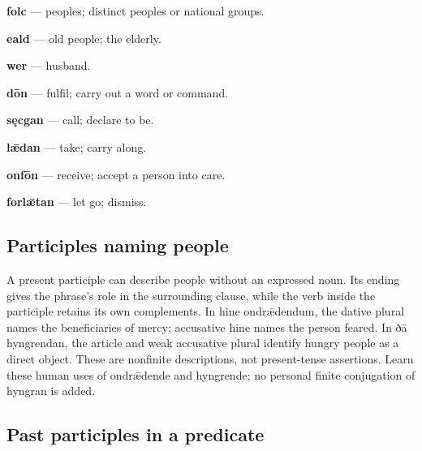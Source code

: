 \textbf{folc} — peoples; distinct peoples or national groups.

\textbf{eald} — old people; the elderly.

\textbf{wer} — husband.

\textbf{dōn} — fulfil; carry out a word or command.

\textbf{sęcgan} — call; declare to be.

\textbf{lǣdan} — take; carry along.

\textbf{onfōn} — receive; accept a person into care.

\textbf{forlǣtan} — let go; dismiss.

\subsection*{Participles naming people}

A present participle can describe people without an expressed noun. Its ending gives the phrase’s role in the surrounding clause, while the verb inside the participle retains its own complements. In hine ondrǣdendum, the dative plural names the beneficiaries of mercy; accusative hine names the person feared. In ðā hyngrendan, the article and weak accusative plural identify hungry people as a direct object. These are nonfinite descriptions, not present-tense assertions. Learn these human uses of ondrǣdende and hyngrende; no personal finite conjugation of hyngran is added.

\subsection*{Past participles in a predicate}

